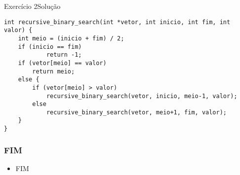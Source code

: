 \documentclass[aspectratio=169]{beamer}
\begin{document}
\begin{frame}[fragile]{Exercício 2}{Solução}
\begin{lstlisting}[style=CStyle]
int recursive_binary_search(int *vetor, int inicio, int fim, int valor) {
    int meio = (inicio + fim) / 2;
    if (inicio == fim)
            return -1;
    if (vetor[meio] == valor)
        return meio;
    else {
        if (vetor[meio] > valor)
            recursive_binary_search(vetor, inicio, meio-1, valor);
        else
            recursive_binary_search(vetor, meio+1, fim, valor);
    }
}
\end{lstlisting}  
\end{frame}



\begin{frame}
  \frametitle{FIM}
\begin{itemize}
\item \alert{FIM}
\end{itemize}
\end{frame}	
\end{document}
